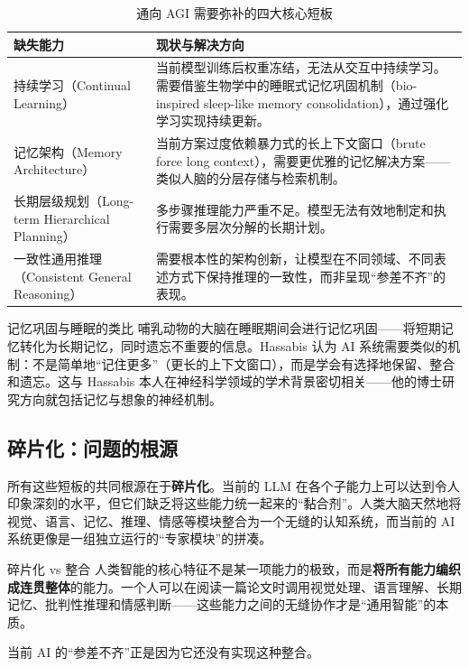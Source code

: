 \documentclass[a4paper]{article}
\begin{document}
\begin{table}[H]
\centering
\begin{tabular}{p{} p{}}
\toprule
\textbf{缺失能力} & \textbf{现状与解决方向} \\
\midrule
持续学习（Continual Learning） & 当前模型训练后权重冻结，无法从交互中持续学习。需要借鉴生物学中的睡眠式记忆巩固机制（bio-inspired sleep-like memory consolidation），通过强化学习实现持续更新。 \\
记忆架构（Memory Architecture） & 当前方案过度依赖暴力式的长上下文窗口（brute force long context），需要更优雅的记忆解决方案——类似人脑的分层存储与检索机制。 \\
长期层级规划（Long-term Hierarchical Planning） & 多步骤推理能力严重不足。模型无法有效地制定和执行需要多层次分解的长期计划。 \\
一致性通用推理（Consistent General Reasoning） & 需要根本性的架构创新，让模型在不同领域、不同表述方式下保持推理的一致性，而非呈现``参差不齐''的表现。 \\
\bottomrule
\end{tabular}
\caption{通向 AGI 需要弥补的四大核心短板}
\end{table}

\begin{knowledgebox}{记忆巩固与睡眠的类比}
哺乳动物的大脑在睡眠期间会进行记忆巩固——将短期记忆转化为长期记忆，同时遗忘不重要的信息。Hassabis 认为 AI 系统需要类似的机制：不是简单地``记住更多''（更长的上下文窗口），而是学会有选择地保留、整合和遗忘。这与 Hassabis 本人在神经科学领域的学术背景密切相关——他的博士研究方向就包括记忆与想象的神经机制。
\end{knowledgebox}

\subsection{碎片化：问题的根源}

所有这些短板的共同根源在于\textbf{碎片化}。当前的 LLM 在各个子能力上可以达到令人印象深刻的水平，但它们缺乏将这些能力统一起来的``黏合剂''。人类大脑天然地将视觉、语言、记忆、推理、情感等模块整合为一个无缝的认知系统，而当前的 AI 系统更像是一组独立运行的``专家模块''的拼凑。

\begin{importantbox}{碎片化 vs 整合}
人类智能的核心特征不是某一项能力的极致，而是\textbf{将所有能力编织成连贯整体}的能力。一个人可以在阅读一篇论文时调用视觉处理、语言理解、长期记忆、批判性推理和情感判断——这些能力之间的无缝协作才是``通用智能''的本质。

当前 AI 的``参差不齐''正是因为它还没有实现这种整合。
\end{importantbox}
\end{document}
